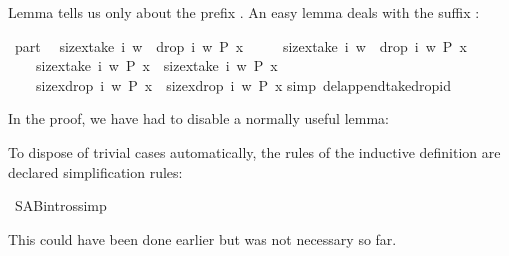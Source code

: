\begin{isabellebody}
\begin{isamarkuptext}
Lemma  tells us only about the prefix .
An easy lemma deals with the suffix :%
\end{isamarkuptext}%
\ part{}{\isacharcolon}\isanewline
\ \ {\isachardoublequote}{\isasymlbrakk}size{\isacharbrackleft}x{\isasymin}take\ i\ w\ {\isacharat}\ drop\ i\ w{\isachardot}\ P\ x{\isacharbrackright}\ {\isacharequal}\isanewline
\ \ \ \ size{\isacharbrackleft}x{\isasymin}take\ i\ w\ {\isacharat}\ drop\ i\ w{\isachardot}\ {\isasymnot}P\ x{\isacharbrackright}{\isacharplus}{}{\isacharsemicolon}\isanewline
\ \ \ \ size{\isacharbrackleft}x{\isasymin}take\ i\ w{\isachardot}\ P\ x{\isacharbrackright}\ {\isacharequal}\ size{\isacharbrackleft}x{\isasymin}take\ i\ w{\isachardot}\ {\isasymnot}P\ x{\isacharbrackright}{\isacharplus}{}{\isasymrbrakk}\isanewline
\ \ \ {\isasymLongrightarrow}\ size{\isacharbrackleft}x{\isasymin}drop\ i\ w{\isachardot}\ P\ x{\isacharbrackright}\ {\isacharequal}\ size{\isacharbrackleft}x{\isasymin}drop\ i\ w{\isachardot}\ {\isasymnot}P\ x{\isacharbrackright}{\isacharplus}{}{\isachardoublequote}\isanewline
{}simp\ del{\isacharcolon}append{\isacharunderscore}take{\isacharunderscore}drop{\isacharunderscore}id{\isacharparenright}%
\begin{isamarkuptext}%
\noindent
In the proof, we have had to disable a normally useful lemma:
\begin{isabelle}
\end{isabelle}

To dispose of trivial cases automatically, the rules of the inductive
definition are declared simplification rules:%
\end{isamarkuptext}%
\ S{\isacharunderscore}A{\isacharunderscore}B{\isachardot}intros{\isacharbrackleft}simp{\isacharbrackright}%
\begin{isamarkuptext}%
\noindent
This could have been done earlier but was not necessary so far.


\end{isamarkuptext}
\end{isabellebody}
